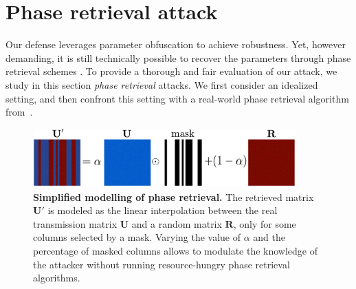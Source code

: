 \section{Phase retrieval attack}\label{sec:phase_retrieval}

Our defense leverages parameter obfuscation to achieve robustness. Yet, however demanding, it is still technically possible to recover the parameters through phase retrieval schemes \cite{Gupta2019DontTI,Gupta2020FastOS}. To provide a thorough and fair evaluation of our attack, we study in this section \emph{phase retrieval} attacks. We first consider an idealized setting, and then confront this setting with a real-world phase retrieval algorithm from~\cite{Gupta2020FastOS}.
\begin{figure}
    \centering
    \includegraphics[width=0.9\textwidth]{sections/appendix/ropust_icassp2022/retrieval-model.pdf}
    \caption{\textbf{Simplified modelling of phase retrieval.} The retrieved matrix $\mathbf{U'}$ is modeled as the linear interpolation between the real transmission matrix $\mathbf{U}$ and a random matrix $\mathbf{R}$, only for some columns selected by a mask. Varying the value of $\alpha$ and the percentage of masked columns allows to modulate the knowledge of the attacker without running resource-hungry phase retrieval algorithms.}
    \label{fig:retrieval-model}
\end{figure}
